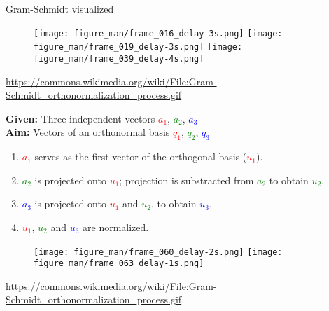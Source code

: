 \documentclass[11pt,compress,t,notes=noshow, xcolor=table]{beamer}
\begin{document}
\begin{vbframe}{Gram-Schmidt visualized}
\begin{scriptsize}
\end{scriptsize}

\begin{figure}
  \centering
  \texttt{[image: figure\_man/frame\_016\_delay-3s.png]}
  \texttt{[image: figure\_man/frame\_019\_delay-3s.png]}
  \texttt{[image: figure\_man/frame\_039\_delay-4s.png]}
\end{figure}
\tiny{\url{https://commons.wikimedia.org/wiki/File:Gram-Schmidt_orthonormalization_process.gif}}

\framebreak

\begin{scriptsize}

\textbf{Given:} Three independent vectors \textcolor{red}{$a_1$}, \textcolor{green}{$a_2$}, \textcolor{blue}{$a_3$} \\
\textbf{Aim:} Vectors of an orthonormal basis \textcolor{red}{$q_1$}, \textcolor{green}{$q_2$}, \textcolor{blue}{$q_3$}

\begin{enumerate}
  \item<2-> \textcolor{red}{$a_1$} serves as the first vector of the orthogonal basis (\textcolor{red}{$u_1$}).
  \item<3-> \textcolor{green}{$a_2$} is projected onto \textcolor{red}{$u_1$}; projection is substracted from \textcolor{green}{$a_2$}
        to obtain \textcolor{green}{$u_2$}.
  \item \textcolor{blue}{$a_3$} is projected onto \textcolor{red}{$u_1$} and \textcolor{green}{$u_2$},
        to obtain \textcolor{blue}{$u_3$}.
  \item<4-> \textcolor{red}{$u_1$}, \textcolor{green}{$u_2$} and \textcolor{blue}{$u_3$} are normalized.
\end{enumerate}

\end{scriptsize}

\begin{figure}
  \centering
  \texttt{[image: figure\_man/frame\_060\_delay-2s.png]}
  \texttt{[image: figure\_man/frame\_063\_delay-1s.png]}
\end{figure}
\tiny{\url{https://commons.wikimedia.org/wiki/File:Gram-Schmidt_orthonormalization_process.gif}}

\framebreak

\begin{scriptsize}


\end{scriptsize}
\end{vbframe}
\end{document}
